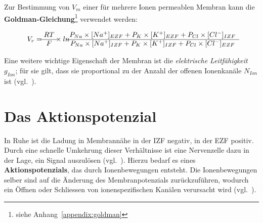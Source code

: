 {\noindent

Zur Bestimmung von $V_m$ einer für mehrere Ionen permeablen Membran kann die \textbf{Goldman-Gleichung}\footnote{
 siehe Anhang~\ref{appendix:goldman}
} verwendet werden:

\begin{equation}
V_{r} = \begin{matrix} RT \\ \hline F \end{matrix}  \times ln \begin{matrix}
  P_{Na} \space  \times \space [Na^+]_{EZF} \space + \space P_{K} \space  \times \space [K^+]_{EZF} \space + \space P_{Cl} \space  \times \space [Cl^-]_{IZF}  \\ \hline
  P_{Na} \space  \times [Na^+]_{IZF} \space + \space P_{K} \space  \times \space [K^+]_{IZF} \space + \space P_{Cl} \space  \times \space [Cl^-]_{EZF}
\end{matrix}
\label{eq:gl-goldman}
\end{equation}

Eine weitere wichtige Eigenschaft der Membran ist die \textit{elektrische Leitfähigkeit} $g_{Ion}$; für sie gilt, dass sie proportional zu der Anzahl der offenen Ionenkanäle $N_{Ion}$ ist (vgl.~\cite[93]{BCP18}).

\section{Das Aktionspotenzial}\label{sec:aktionspotenzial}

In Ruhe ist die Ladung in Membrannähe in der IZF negativ, in der EZF positiv.
Durch eine schnelle Umkehrung dieser Verhältnisse ist eine Nervenzelle dazu in der Lage, ein Signal auszulösen (vgl.~\cite[86]{BCP18}).
Hierzu bedarf es eines \textbf{Aktionspotenzials}, das durch Ionenbewegungen entsteht. Die Ionenbewegungen selber sind auf die Änderung des Membranpotenzials zurückzuführen, wodurch ein Öffnen oder Schliessen von ionenspezifischen Kanälen verursacht wird (vgl.~\cite[96]{BCP18}).

}

